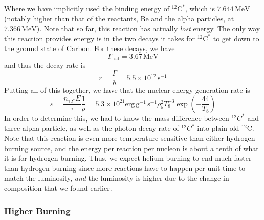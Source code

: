 \documentclass[10pt]{article}
\numberwithin{equation}{section}
\begin{document}
    Where we have implicitly used the binding energy of
    ${}^{12}\mathrm{C}^*$, which is $7.644\,\mathrm{MeV}$ (notably
    higher than that of the reactants, Be and the alpha particles, at
    $7.366\,\mathrm{MeV}$). Note that so far, this reaction has
    actually \emph{lost} energy. The only way this reaction provides
    energy is in the two decays it takes for ${}^{12}\mathrm{C}^*$ to
    get down to the ground state of Carbon. For these decays, we have
    \begin{equation}
      \label{eq:272}
      \Gamma_{\mathrm{rad}}=3.67\,\mathrm{MeV}
    \end{equation}
    and thus the decay rate is
    \begin{equation}
      \label{eq:273}
      r=\frac{\Gamma}{\hbar}=5.5 \times 10^{12}\,\mathrm{s^{-1}}
    \end{equation}
    Putting all of this together, we have that the nuclear energy
    generation rate is
    \begin{equation}
      \label{eq:274}
      \varepsilon = \frac{n_{12^*}E}{\tau}\frac{1}{\rho}=5.3\times 10^
{21}\mathrm{erg\,g^{-1}\,s^{-1}}\rho_5^2T_8^{-3}\exp\left(-\frac{44}
{T_8}\right)
    \end{equation}
    In order to determine this, we had to know the mass difference
    between ${}^{12}C^*$ and three alpha particle, as well as the
    photon decay rate of ${}^{12}C^*$ into plain old
    $^{12}\mathrm{C}$. Note that this reaction is even more
    temperature sensitive than either hydrogen burning source, and the
    energy per reaction per nucleon is about a tenth of what it is for
    hydrogen burning. Thus, we expect helium burning to end much
    faster than hydrogen burning since more reactions have to happen
    per unit time to match the luminosity, \emph{and} the luminosity
    is higher due to the change in composition that we found earlier.\\
    
    \subsubsection{Higher Burning}
    \label{sec:higher-burning-1}
\end{document}

